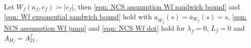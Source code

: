 %
%
Let $W_f(\kappa_f,e_f) \coloneqq |e_f|$, then \eqref{eqn: NCS assumption Wf sandwich bound} and \eqref{eqn: Wf exponential sandwich bound} hold with $\underline{a}_{W_f}(s) = \overline{a}_{W_f}(s) = s$, \eqref{eqn: NCS assumption Wf jump} and \eqref{eqn: NCS Wf dot} hold for $\lambda_f = 0 $, $L_f = 0$ and $A_{H_f} = A_{21}^f$. 
